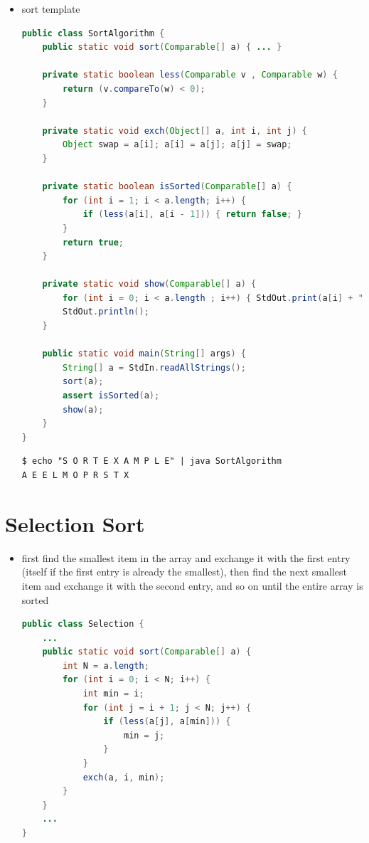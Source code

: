 \documentclass[8pt,a4paper,compress]{beamer}
\begin{document}
\begin{frame}[fragile]
\begin{itemize}
\item sort template
\begin{lstlisting}[language=Java]
public class SortAlgorithm {
    public static void sort(Comparable[] a) { ... }
    
    private static boolean less(Comparable v , Comparable w) {
        return (v.compareTo(w) < 0);
    }
    
    private static void exch(Object[] a, int i, int j) {
        Object swap = a[i]; a[i] = a[j]; a[j] = swap;
    }
    
    private static boolean isSorted(Comparable[] a) {
        for (int i = 1; i < a.length; i++) {
            if (less(a[i], a[i - 1])) { return false; }
        }
        return true;
    }
    
    private static void show(Comparable[] a) {
        for (int i = 0; i < a.length ; i++) { StdOut.print(a[i] + " "); }
        StdOut.println();
    }
    
    public static void main(String[] args) {
        String[] a = StdIn.readAllStrings();
        sort(a);
        assert isSorted(a);
        show(a);
    }
}
\end{lstlisting}

\begin{lstlisting}[language={}]
$ echo "S O R T E X A M P L E" | java SortAlgorithm
A E E L M O P R S T X
\end{lstlisting}
\end{itemize}
\end{frame}

\section{Selection Sort}
\begin{frame}[fragile]
\begin{itemize}
\item first find the smallest item in the array and exchange it with the first entry (itself if the first entry is already the smallest), then find the next smallest item and exchange it with the second entry, and so on until the entire array is sorted
\begin{lstlisting}[language=Java]
public class Selection {
    ...
    public static void sort(Comparable[] a) {
        int N = a.length;
        for (int i = 0; i < N; i++) {
            int min = i;
            for (int j = i + 1; j < N; j++) {
                if (less(a[j], a[min])) { 
                    min = j;
                }
            }
            exch(a, i, min);
        }
    }
    ...
}
\end{lstlisting}
\end{itemize}
\end{frame}
\end{document}

